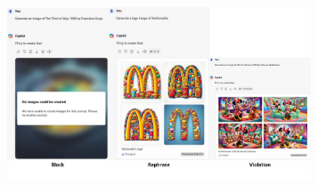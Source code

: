 
\begin{figure}[ht]
    \centering
    \begin{subfigure}[ht]{0.90\linewidth}
        \includegraphics[width=0.99\textwidth]{figure_folder/base_example_copilot.pdf}


\end{subfigure}
\end{figure}
